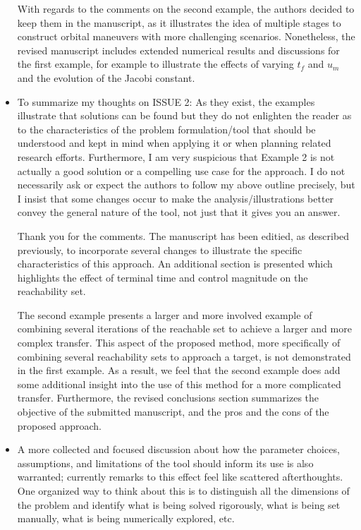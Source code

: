 \documentclass[11pt]{article}
\begin{document}
\begin{itemize}
		With regards to the comments on the second example, the authors decided to keep them in the manuscript, as it illustrates the idea of multiple stages to construct orbital maneuvers with more challenging scenarios. 
		Nonetheless, the revised manuscript includes extended numerical results and discussions for the first example, for example to illustrate the effects of varying $t_f$ and $u_m$ and the evolution of the Jacobi constant. 
    \item 
        \begin{itshape}
            To summarize my thoughts on ISSUE 2:
            As they exist, the examples illustrate that solutions can be found but they do not enlighten the reader as to the characteristics of the problem formulation/tool that should be understood and kept in mind when applying it or when planning related research efforts.  Furthermore, I am very suspicious that Example 2 is not actually a good solution or a compelling use case for the approach.  I do not necessarily ask or expect the authors to follow my above outline precisely, but I insist that some changes occur to make the analysis/illustrations better convey the general nature of the tool, not just that it gives you an answer.  
        \end{itshape}
    
        Thank you for the comments.
        The manuscript has been editied, as described previously, to incorporate several changes to illustrate the specific characteristics of this approach.
        An additional section is presented which highlights the effect of terminal time and control magnitude on the reachability set. 

        The second example presents a larger and more involved example of combining several iterations of the reachable set to achieve a larger and more complex transfer. 
        This aspect of the proposed method, more specifically of combining several reachability sets to approach a target, is not demonstrated in the first example.
        As a result, we feel that the second example does add some additional insight into the use of this method for a more complicated transfer.
		Furthermore, the revised conclusions section summarizes the objective of the submitted manuscript, and the pros and the cons of the proposed approach. 

    \item
        \begin{itshape}
            A more collected and focused discussion about how the parameter choices, assumptions, and limitations of the tool should inform its use is also warranted; currently remarks to this effect feel like scattered afterthoughts.  One organized way to think about this is to distinguish all the dimensions of the problem and identify what is being solved rigorously, what is being set manually, what is being numerically explored, etc.
        \end{itshape}


\end{itemize}
\end{document}
